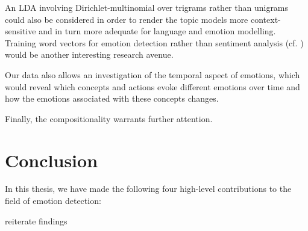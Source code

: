 An LDA involving Dirichlet-multinomial over trigrams rather than unigrams could also be considered in order to render the topic models more context-sensitive and in turn more adequate for language and emotion modelling. Training word vectors for emotion detection rather than sentiment analysis (cf. \cite{word_vectors_sentiment}) would be another interesting research avenue.

Our data also allows an investigation of the temporal aspect of emotions, which would reveal which concepts and actions evoke different emotions over time and how the emotions associated with these concepts changes.

Finally, the compositionality warrants further attention. 

\section{Conclusion} \label{sec:conclusion}

In this thesis, we have made the following four high-level contributions to the field of emotion detection:




reiterate findings
